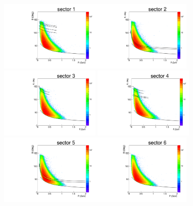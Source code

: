 \begin{figure}[htp]
\begin{center}
\begin{minipage}{.99\textwidth}
\begin{framed}
\end{framed}
\end{minipage}
\begin{minipage}{.99\textwidth}
\begin{framed}
\includegraphics[width=5cm]{pictures/other_cuts/fiduch/th_vs_p_pim_sim/pim_th_vs_p_sim_sector1.pdf}\includegraphics[width=5cm]{pictures/other_cuts/fiduch/th_vs_p_pim_sim/pim_th_vs_p_sim_sector2.pdf}\includegraphics[width=5cm]{pictures/other_cuts/fiduch/th_vs_p_pim_sim/pim_th_vs_p_sim_sector3.pdf}
\includegraphics[width=5cm]{pictures/other_cuts/fiduch/th_vs_p_pim_sim/pim_th_vs_p_sim_sector4.pdf}\includegraphics[width=5cm]{pictures/other_cuts/fiduch/th_vs_p_pim_sim/pim_th_vs_p_sim_sector5.pdf}\includegraphics[width=5cm]{pictures/other_cuts/fiduch/th_vs_p_pim_sim/pim_th_vs_p_sim_sector6.pdf}

\end{framed}
\end{minipage}
\end{center}
\end{figure}
